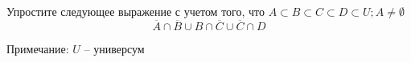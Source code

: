 \question
Упростите следующее выражение с учетом того, что $A\subset B \subset C \subset D \subset U; A \neq \emptyset$
\begin{equation*}
	\overline{A} \cap \overline{B} \cup B \cap \overline{C} \cup \overline{C} \cap D
\end{equation*}

Примечание: $U$ -- универсум